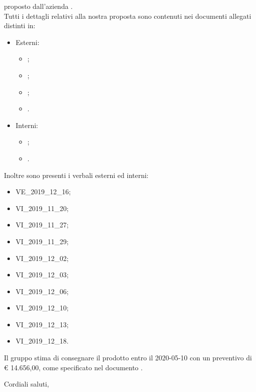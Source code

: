 \documentclass[12pt]{letter}
\begin{document}
\begin{letter}
\begin{center}
        \end{center}
        proposto dall'azienda \textbf{\Proponente{}}.\\
        Tutti i dettagli relativi alla nostra proposta sono contenuti nei documenti allegati distinti in: \\
        \begin{itemize}
        \item Esterni:
        \begin{itemize}
            \item {};
            \item {};
            \item {};
            \item {}.
        \end{itemize}
        \item Interni:
        \begin{itemize}
            \item {};
            \item {}.
        \end{itemize}
    \end{itemize}
        Inoltre sono presenti i verbali esterni ed interni:
        \begin{itemize}
            \item VE\_2019\_12\_16;
            \item VI\_2019\_11\_20;
            \item VI\_2019\_11\_27;
            \item VI\_2019\_11\_29;
            \item VI\_2019\_12\_02;
            \item VI\_2019\_12\_03;
            \item VI\_2019\_12\_06;
            \item VI\_2019\_12\_10;
            \item VI\_2019\_12\_13;
            \item VI\_2019\_12\_18.
        \end{itemize}
        Il gruppo stima di consegnare il prodotto entro il 2020-05-10 con un preventivo di \euro{} 14.656,00, come specificato nel documento .
        \closing{Cordiali saluti,}
        \vspace{10mm}
    \end{letter}
\end{document}
